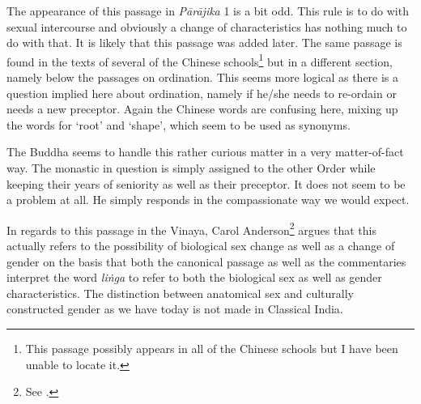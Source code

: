 The appearance of this passage in {\em Pārājika} 1 is a bit odd. This rule is to do with sexual intercourse and obviously a change of characteristics has nothing much to do with that. It is likely that this passage was added later. The same passage is found in the texts of several of the Chinese schools\footnote{This passage possibly appears in all of the Chinese schools but I have been unable to locate it.} but in a different section, namely below the passages on ordination. This seems more logical as there is a question implied here about ordination, namely if he/she needs to re-ordain or needs a new preceptor. Again the Chinese words are confusing here, mixing up the words for `root' and `shape', which seem to be used as synonyms.

The Buddha seems to handle this rather curious matter in a very matter-of-fact way. The monastic in question is simply assigned to the other Order while keeping their years of seniority as well as their preceptor. It does not seem to be a problem at all. He simply responds in the compassionate way we would expect.

In regards to this passage in the Vinaya, Carol Anderson\footnote{See \cite{anderson2016a}.} argues that this actually refers to the possibility of biological sex change as well as a change of gender on the basis that both the canonical passage as well as the commentaries interpret the word {\em liṅga} to refer to both the biological sex as well as gender characteristics. The distinction between anatomical sex and culturally constructed gender as we have today is not made in Classical India.

